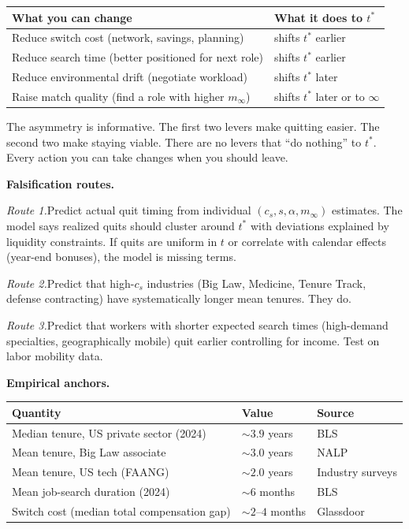 \documentclass[11pt]{article}
\begin{document}
\begin{tabular}{ll}
\toprule
What you can change & What it does to $t^*$ \\
\midrule
Reduce switch cost (network, savings, planning) & shifts $t^*$ earlier \\
Reduce search time (better positioned for next role) & shifts $t^*$ earlier \\
Reduce environmental drift (negotiate workload) & shifts $t^*$ later \\
Raise match quality (find a role with higher $m_\infty$) & shifts $t^*$ later or to $\infty$ \\
\bottomrule
\end{tabular}

\medskip\noindent The asymmetry is informative. The first two levers make
quitting easier. The second two make staying viable. There are no levers
that ``do nothing'' to $t^*$. Every action you can take changes when you
should leave.

\medskip\noindent\textbf{Falsification routes.}\quad

\noindent\textit{Route 1.}\quad Predict actual quit timing from individual
$(c_s, s, \alpha, m_\infty)$ estimates. The model says realized quits should
cluster around $t^*$ with deviations explained by liquidity constraints. If
quits are uniform in $t$ or correlate with calendar effects (year-end bonuses),
the model is missing terms.

\noindent\textit{Route 2.}\quad Predict that high-$c_s$ industries (Big Law,
Medicine, Tenure Track, defense contracting) have systematically longer mean
tenures. They do.

\noindent\textit{Route 3.}\quad Predict that workers with shorter expected
search times (high-demand specialties, geographically mobile) quit earlier
controlling for income. Test on labor mobility data.

\newpage

\medskip\noindent\textbf{Empirical anchors.}

\begin{tabular}{lll}
\toprule
Quantity & Value & Source \\
\midrule
Median tenure, US private sector (2024)     & $\sim 3.9$ years     & BLS \\
Mean tenure, Big Law associate              & $\sim 3.0$ years     & NALP \\
Mean tenure, US tech (FAANG)                & $\sim 2.0$ years     & Industry surveys \\
Mean job-search duration (2024)             & $\sim 6$ months      & BLS \\
Switch cost (median total compensation gap) & $\sim 2$--$4$ months & Glassdoor \\
\bottomrule
\end{tabular}
\end{document}
